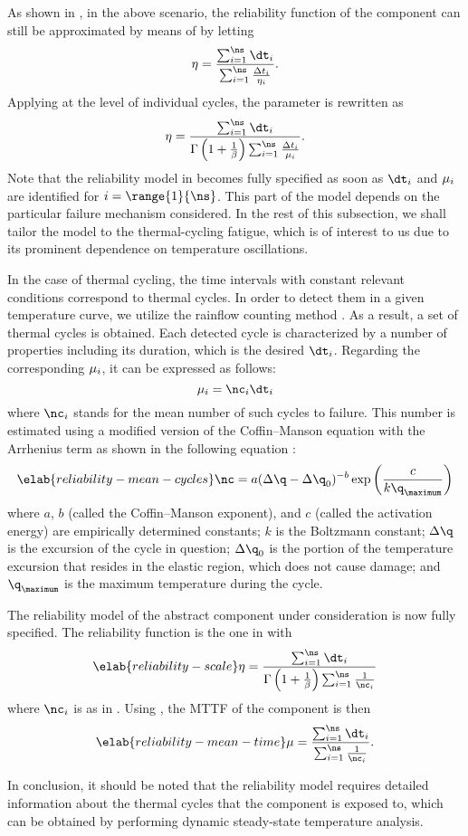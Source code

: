 As shown in \cite{xiang2010}, in the above scenario, the reliability function of
the component can still be approximated by means of 
by letting
\[
  \scale = \frac{\sum_{i = 1}^\ns \dt_i}{\sum_{i = 1}^\ns \frac{\Delta t_i}{\scale_i}}.
\]
Applying  at the level of individual cycles, the
parameter is rewritten as
\[
  \scale = \frac{\sum_{i = 1}^\ns \dt_i}{\Gamma\left(1 + \frac{1}{\shape}\right) \sum_{i = 1}^\ns \frac{\Delta t_i}{\mean_i}}.
\]
Note that the reliability model in  becomes fully
specified as soon as $\dt_i$ and $\mu_i$ are identified for $i =
\range{1}{\ns}$. This part of the model depends on the particular failure
mechanism considered. In the rest of this subsection, we shall tailor the model
to the thermal-cycling fatigue, which is of interest to us due to its prominent
dependence on temperature oscillations.

In the case of thermal cycling, the time intervals with constant relevant
conditions correspond to thermal cycles. In order to detect them in a given
temperature curve, we utilize the rainflow counting method \cite{xiang2010}. As
a result, a set of \ns thermal cycles is obtained. Each detected cycle is
characterized by a number of properties including its duration, which is the
desired $\dt_i$. Regarding the corresponding $\mu_i$, it can be expressed as
follows:
\[
  \mean_i = \nc_i \dt_i
\]
where $\nc_i$ stands for the mean number of such cycles to failure. This number
is estimated using a modified version of the Coffin--Manson equation with the
Arrhenius term as shown in the following equation \cite{xiang2010, jedec2016}:
\begin{equation} \elab{reliability-mean-cycles}
  \nc = a (\Delta \q - \Delta \q_0)^{-b} \exp\left(\frac{c}{k \q_\maximum}\right)
\end{equation}
where $a$, $b$ (called the Coffin--Manson exponent), and $c$ (called the
activation energy) are empirically determined constants; $k$ is the Boltzmann
constant; $\Delta \q$ is the excursion of the cycle in question; $\Delta \q_0$
is the portion of the temperature excursion that resides in the elastic region,
which does not cause damage; and $\q_\maximum$ is the maximum temperature during
the cycle.

The reliability model of the abstract component under consideration is now fully
specified. The reliability function is the one in 
with
\begin{equation} \elab{reliability-scale}
  \scale = \frac{\sum_{i = 1}^\ns \dt_i}{\Gamma\left(1 + \frac{1}{\shape}\right) \sum_{i = 1}^\ns \frac{1}{\nc_i}}
\end{equation}
where $\nc_i$ is as in . Using
, the \ac{MTTF} of the
component is then
\begin{equation} \elab{reliability-mean-time}
  \mean = \frac{\sum_{i = 1}^\ns \dt_i}{\sum_{i = 1}^\ns \frac{1}{\nc_i}}.
\end{equation}

In conclusion, it should be noted that the reliability model requires detailed
information about the thermal cycles that the component is exposed to, which can
be obtained by performing dynamic steady-state temperature analysis.
